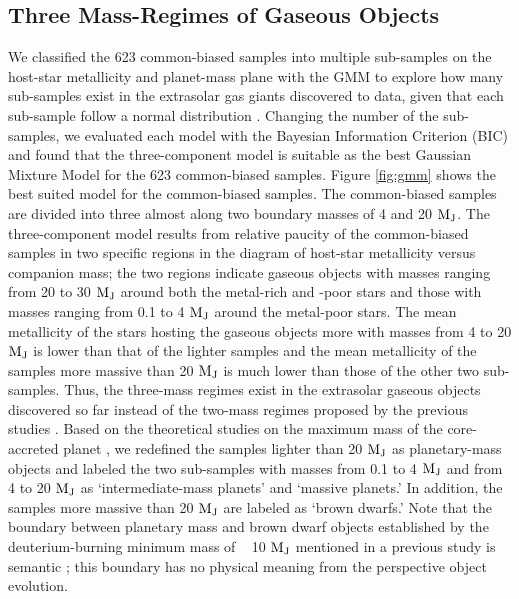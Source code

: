 \documentclass[twocolumn, dvipdfmx]{aastex62}
\begin{document}
\begin{CJK*}{UTF8}{min}
\subsection{Three Mass-Regimes of Gaseous Objects} \label{subsec:mass}

We classified the 623 common-biased samples into multiple sub-samples on the host-star metallicity and planet-mass plane with the GMM to explore how many sub-samples exist in the extrasolar gas giants discovered to data, given that each sub-sample follow a normal distribution \citep[e.g.,][]{2017A&A...603A..30S, 2018ApJ...853...37S}. Changing the number of the sub-samples, we evaluated each model with the Bayesian Information Criterion (BIC) and found that the three-component model is suitable as the best Gaussian Mixture Model for the 623 common-biased samples. Figure \ref{fig:gmm} shows the best suited model for the common-biased samples. The common-biased samples are divided into three almost along two boundary masses of 4 and 20 $\rm M_J$. The three-component model results from relative paucity of the common-biased samples in two specific regions in the diagram of host-star metallicity versus companion mass; the two regions indicate gaseous objects with masses ranging from 20 to 30 $\rm M_J$ around both the metal-rich and -poor stars and those with masses ranging from 0.1 to 4 $\rm M_J$ around the metal-poor stars. The mean metallicity of the stars hosting the gaseous objects more with masses from 4 to 20 $\rm M_J$ is lower than that of the lighter samples and the mean metallicity of the samples more massive than 20 $\rm M_J$ is much lower than those of the other two sub-samples. Thus, the three-mass regimes exist in the extrasolar gaseous objects discovered so far instead of the two-mass regimes proposed by the previous studies \citep{2007A&A...464..779R, 2017A&A...603A..30S, 2018ApJ...853...37S}. Based on the theoretical studies on the maximum mass of the core-accreted planet \citep[e.g.,][]{2012A&A...541A..97M, 2016ApJ...823...48T}, we redefined the samples lighter than 20 $\rm M_J$ as planetary-mass objects and labeled the two sub-samples with masses from 0.1 to 4 $\rm M_J$ and from 4 to 20 $\rm M_J$ as ‘intermediate-mass planets’ and ‘massive planets.’ In addition, the samples more massive than 20 $\rm M_J$ are labeled as ‘brown dwarfs.’ Note that the boundary between planetary mass and brown dwarf objects established by the deuterium-burning minimum mass of ~ 10 $\rm M_J$ mentioned in a previous study is semantic \citep{2014prpl.conf..619C}; this boundary has no physical meaning from the perspective object evolution.


\end{CJK*}
\end{document}
